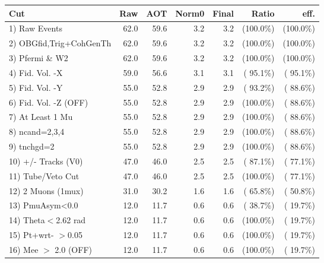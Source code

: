  \begin{table}[h!]\centering
 \begin{tabular}{||l||r|r|r|r|r|r||}
 \hline
 \hline
 Cut & Raw & AOT & Norm0 & Final & Ratio & eff.       \\
 \hline
  1) Raw Events           &         62.0 &         59.6 &          3.2 &          3.2 & (100.0\%) & (100.0\%) \\
  2) OBGfid,Trig+CohGenTh &         62.0 &         59.6 &          3.2 &          3.2 & (100.0\%) & (100.0\%) \\
  3) Pfermi \& W2         &         62.0 &         59.6 &          3.2 &          3.2 & (100.0\%) & (100.0\%) \\
  4) Fid. Vol. -X         &         59.0 &         56.6 &          3.1 &          3.1 & ( 95.1\%) & ( 95.1\%) \\
  5) Fid. Vol. -Y         &         55.0 &         52.8 &          2.9 &          2.9 & ( 93.2\%) & ( 88.6\%) \\
  6) Fid. Vol. -Z (OFF)   &         55.0 &         52.8 &          2.9 &          2.9 & (100.0\%) & ( 88.6\%) \\
  7) At Least 1 Mu        &         55.0 &         52.8 &          2.9 &          2.9 & (100.0\%) & ( 88.6\%) \\
  8) ncand=2,3,4          &         55.0 &         52.8 &          2.9 &          2.9 & (100.0\%) & ( 88.6\%) \\
  9) tnchgd=2             &         55.0 &         52.8 &          2.9 &          2.9 & (100.0\%) & ( 88.6\%) \\
 10) +/- Tracks (V0)      &         47.0 &         46.0 &          2.5 &          2.5 & ( 87.1\%) & ( 77.1\%) \\
 11) Tube/Veto Cut        &         47.0 &         46.0 &          2.5 &          2.5 & (100.0\%) & ( 77.1\%) \\
 12) 2 Muons (1mux)       &         31.0 &         30.2 &          1.6 &          1.6 & ( 65.8\%) & ( 50.8\%) \\
 13) PmuAsym<0.0          &         12.0 &         11.7 &          0.6 &          0.6 & ( 38.7\%) & ( 19.7\%) \\
 14) Theta$<$2.62 rad     &         12.0 &         11.7 &          0.6 &          0.6 & (100.0\%) & ( 19.7\%) \\
 15) Pt+wrt- $>$0.05      &         12.0 &         11.7 &          0.6 &          0.6 & (100.0\%) & ( 19.7\%) \\
 16) Mee $>$ 2.0  (OFF)   &         12.0 &         11.7 &          0.6 &          0.6 & (100.0\%) & ( 19.7\%) \\

\end{tabular}
\end{table}
